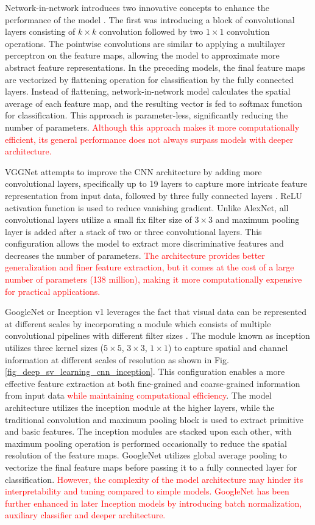 \documentclass[preprint,12pt]{elsarticle}
\begin{document}
Network-in-network introduces two innovative concepts to enhance the performance of the model \citep{lin_network_2014}. The first was introducing a block of convolutional layers consisting of $k \times k$ convolution followed by two $1 \times 1$ convolution operations. The pointwise convolutions are similar to applying a multilayer perceptron on the feature maps, allowing the model to approximate more abstract feature representations. In the preceding models, the final feature maps are vectorized by flattening operation for classification by the fully connected layers. Instead of flattening, network-in-network model calculates the spatial average of each feature map, and the resulting vector is fed to softmax function for classification. This approach is parameter-less, significantly reducing the number of parameters. \textcolor{red}{Although this approach makes it more computationally efficient, its general performance does not always surpass models with deeper architecture.}

VGGNet attempts to improve the CNN architecture by adding more convolutional layers, specifically up to 19 layers to capture more intricate feature representation from input data, followed by three fully connected layers \citep{simonyan_very_2015}. ReLU activation function is used to reduce vanishing gradient. Unlike AlexNet, all convolutional layers utilize a small fix filter size of $3 \times 3$ and maximum pooling layer is added after a stack of two or three convolutional layers. This configuration allows the model to extract more discriminative features and decreases the number of parameters. \textcolor{red}{The architecture provides better generalization and finer feature extraction, but it comes at the cost of a large number of parameters (138 million), making it more computationally expensive for practical applications.}

GoogleNet or Inception v1 leverages the fact that visual data can be represented at different scales by incorporating a module which consists of multiple convolutional pipelines with different filter sizes \citep{szegedy_going_2014}. The module known as inception utilizes three kernel sizes ($5 \times 5$, $3 \times 3$, $1 \times 1$) to capture spatial and channel information at different scales of resolution as shown in Fig. \ref{fig_deep_sv_learning_cnn_inception}. This configuration enables a more effective feature extraction at both fine-grained and coarse-grained information from input data \textcolor{red}{while maintaining computational efficiency}. The model architecture utilizes the inception module at the higher layers, while the traditional convolution and maximum pooling block is used to extract primitive and basic features. The inception modules are stacked upon each other, with maximum pooling operation is performed occasionally to reduce the spatial resolution of the feature maps. GoogleNet utilizes global average pooling to vectorize the final feature maps before passing it to a fully connected layer for classification. \textcolor{red}{However, the complexity of the model architecture may hinder its interpretability and tuning compared to simple models. GoogleNet has been further enhanced in later Inception models by introducing batch normalization, auxiliary classifier and deeper architecture.}
\end{document}
